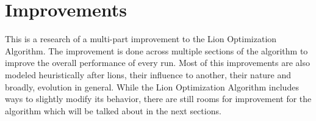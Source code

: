 \section{Improvements}

\par This is a research of a multi-part improvement to the Lion Optimization Algorithm. The improvement is done across multiple sections of the algorithm to improve the overall performance of every run. Most of this improvements are also modeled heuristically after lions, their influence to another, their nature and broadly, evolution in general. While the Lion Optimization Algorithm includes ways to slightly modify its behavior, there are still rooms for improvement for the algorithm which will be talked about in the next sections.
